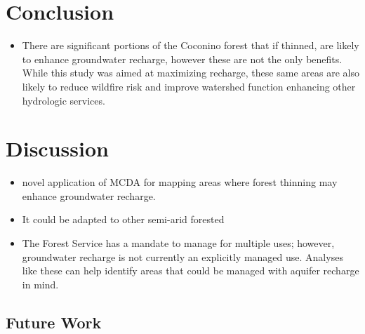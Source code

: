 \documentclass[
  number,
  preprint,
  3p,
  onecolumn]{elsarticle}
\providecommand{\tightlist}{%
  \setlength{\itemsep}{0pt}\setlength{\parskip}{0pt}}\usepackage{longtable,booktabs,array}
\begin{document}
\section{Conclusion}\label{conclusion}

\begin{itemize}
\tightlist
\item
  There are significant portions of the Coconino forest that if thinned,
  are likely to enhance groundwater recharge, however these are not the
  only benefits. While this study was aimed at maximizing recharge,
  these same areas are also likely to reduce wildfire risk and improve
  watershed function enhancing other hydrologic services.
\end{itemize}

\section{Discussion}\label{discussion}

\begin{itemize}
\item
  novel application of MCDA for mapping areas where forest thinning may
  enhance groundwater recharge.
\item
  It could be adapted to other semi-arid forested
\item
  The Forest Service has a mandate to manage for multiple uses; however,
  groundwater recharge is not currently an explicitly managed use.
  Analyses like these can help identify areas that could be managed with
  aquifer recharge in mind.
\end{itemize}

\subsection{Future Work}\label{future-work}
\end{document}
